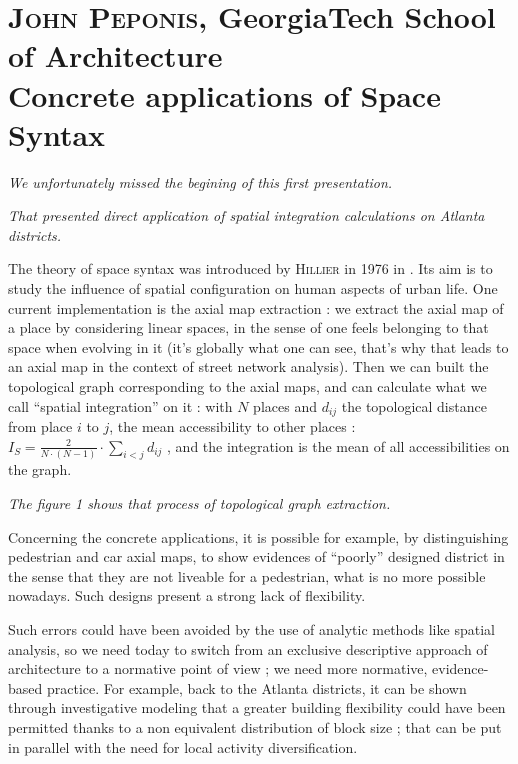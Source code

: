 \documentclass[english]{article}
\newcommand{\noun}[1]{\textsc{#1}}
\begin{document}
\newpage{}


\section*{\noun{John Peponis}, GeorgiaTech School of Architecture\protect \\
Concrete applications of Space Syntax}

\textit{We unfortunately missed the begining of this first presentation.}

\textit{That presented direct application of spatial integration calculations
on Atlanta districts.}

\bigskip{}


The theory of space syntax was introduced by \noun{Hillier} in 1976
in \cite{hillier1976space}. Its aim is to study the influence of
spatial configuration on human aspects of urban life. One current
implementation is the axial map extraction : we extract the axial
map of a place by considering linear spaces, in the sense of one feels
belonging to that space when evolving in it (it's globally what one
can see, that's why that leads to an axial map in the context of street
network analysis). Then we can built the topological graph corresponding
to the axial maps, and can calculate what we call ``spatial integration''
on it : with $N$ places and $d_{ij}$ the topological distance from
place $i$ to $j$, the mean accessibility to other places : $I_{S}=\frac{2}{N\cdot(N-1)}\cdot\sum_{i<j}d_{ij}$
, and the integration is the mean of all accessibilities on the graph.

\textit{The figure 1 shows that process of topological graph extraction.}

\bigskip{}


Concerning the concrete applications, it is possible for example,
by distinguishing pedestrian and car axial maps, to show evidences
of ``poorly'' designed district in the sense that they are not liveable
for a pedestrian, what is no more possible nowadays. Such designs
present a strong lack of flexibility.

\bigskip{}


Such errors could have been avoided by the use of analytic methods
like spatial analysis, so we need today to switch from an exclusive
descriptive approach of architecture to a normative point of view
; we need more normative, evidence-based practice. For example, back
to the Atlanta districts, it can be shown through investigative modeling
that a greater building flexibility could have been permitted thanks
to a non equivalent distribution of block size ; that can be put in
parallel with the need for local activity diversification.
\end{document}
